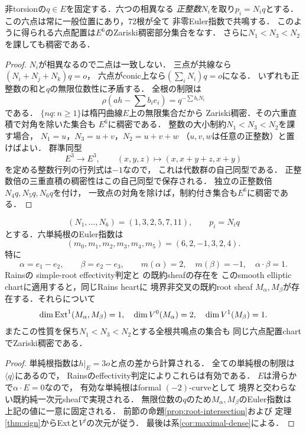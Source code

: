 \begin{corollary}[全72根の同時共鳴はZariski稠密]
\label{cor:maximal-dense}
非torsionの$q\in E$を固定する．六つの相異なる
\emph{正整数}$N_i$を取り$p_i=N_iq$とする．
この六点は常に一般位置にあり，$72$根が全て
非零Euler指数で共鳴する．
このように得られる六点配置は$E^6$のZariski稠密部分集合をなす．
さらに$N_1<N_3<N_2$を課しても稠密である．
\end{corollary}
\begin{proof}
$N_i$が相異なるので二点は一致しない．
三点が共線なら$(N_i+N_j+N_k)q=o$，
六点がconic上なら$(\sum_iN_i)q=o$になる．
いずれも正整数の和と$q$の無限位数性に矛盾する．
全根の制限は
\[
 \rho(ah-\sum b_ie_i)=
 q^{-\sum b_iN_i}
\]
である．
$\{nq:n\ge1\}$は楕円曲線$E$上の無限集合だから
Zariski稠密．その六重直積で対角を除いた集合も
$E^6$に稠密である．
整数の大小制約$N_1<N_3<N_2$を課す場合，
$N_1=u$，$N_3=u+v$，$N_2=u+v+w$
（$u,v,w$は任意の正整数）と置けばよい．
群準同型
\[
 E^3\longrightarrow E^3,\qquad
 (x,y,z)\longmapsto(x,x+y+z,x+y)
\]
を定める整数行列の行列式は$-1$なので，
これは代数群の自己同型である．
正整数倍の三重直積の稠密性はこの自己同型で保存される．
独立の正整数倍$N_4q,N_5q,N_6q$を付け，
一致点の対角を除けば，制約付き集合も$E^6$に稠密である．
\end{proof}

\begin{proposition}[実在する正負の単純根sheaf]
\label{prop:actual-mixed-a2}
\[
 (N_1,\ldots,N_6)=(1,3,2,5,7,11),\qquad p_i=N_iq
\]
とする．六単純根のEuler指数は
\[
 (m_0,m_1,m_2,m_3,m_4,m_5)=(6,2,-1,3,2,4).
\]
特に
\[
 \alpha=e_1-e_2,\qquad\beta=e_2-e_3,\qquad
 m(\alpha)=2,\quad m(\beta)=-1,\quad
 \alpha\cdot\beta=1.
\]
Rains\cite[\S4, (4.14)--(4.15)]{RainsFiltered}の
simple-root effectivity判定と
\cite[\S9,\S11]{RainsBirational}の既約sheafの存在を
このsmooth elliptic chartに適用すると，同じRains heartに
境界非交叉の既約root sheaf
$M_\alpha,M_\beta$が存在する．それらについて
\[
 \dim\operatorname{Ext}^1(M_\alpha,M_\beta)=1,\quad
 \dim V^0(M_\alpha)=2,\quad
 \dim V^1(M_\beta)=1.
\]
またこの性質を保ち$N_1<N_3<N_2$とする全根共鳴点の集合も
同じ六点配置chartでZariski稠密である．
\end{proposition}
\begin{proof}
単純根指数は$h|_E=3o$と点の差から計算される．
全ての単純根の制限は$\langle q\rangle$にあるので，
Rainsのeffectivity判定によりこれらは有効である．
$E$は滑らかで$\alpha\cdot E=0$なので，
有効な単純根はformal $(-2)$-curveとして
境界と交わらない既約純一次元sheafで実現される．
無限位数の$q$のため$M_\alpha,M_\beta$のEuler指数は
上記の値に一意に固定される．
前節の命題\ref{prop:root-intersection}および
定理\ref{thm:sign}からExtと$V^j$の次元が従う．
最後は系\ref{cor:maximal-dense}による．
\end{proof}

